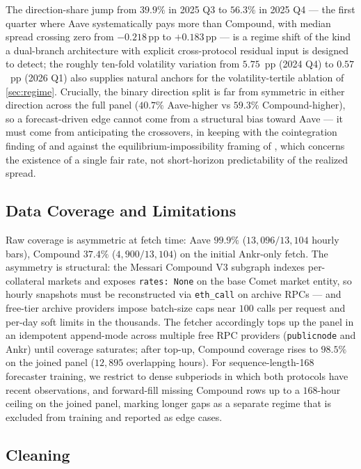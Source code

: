 The direction-share jump from $39.9\%$ in 2025 Q3 to $56.3\%$ in
2025 Q4 --- the first quarter where Aave systematically pays more
than Compound, with median spread crossing zero from $-0.218$\,pp to
$+0.183$\,pp --- is a regime shift of the kind a dual-branch
architecture with explicit cross-protocol residual input is designed
to detect; the roughly ten-fold volatility variation from $5.75$~pp
(2024 Q4) to $0.57$~pp (2026 Q1) also supplies natural anchors for
the volatility-tertile ablation of \cref{sec:regime}. Crucially, the
binary direction split is far from symmetric in either direction
across the full panel ($40.7\%$ Aave-higher vs $59.3\%$
Compound-higher), so a forecast-driven edge cannot come from a
structural bias toward Aave --- it must come from anticipating the
crossovers, in keeping with the cointegration finding of
\cite{gudgeon2020defi} and against the equilibrium-impossibility
framing of \cite{halpern2024fairrates}, which concerns the existence
of a single fair rate, not short-horizon predictability of the
realized spread.

\subsection{Data Coverage and Limitations}
\label{sec:coverage}

Raw coverage is asymmetric at fetch time: Aave $99.9\%$
($13{,}096 / 13{,}104$ hourly bars), Compound $37.4\%$
($4{,}900 / 13{,}104$) on the initial Ankr-only fetch. The asymmetry
is structural: the Messari Compound V3 subgraph indexes per-collateral
markets and exposes \texttt{rates: None} on the base Comet market
entity, so hourly snapshots must be reconstructed via \texttt{eth\_call}
on archive RPCs --- and free-tier archive providers impose batch-size
caps near $100$ calls per request and per-day soft limits in the
thousands. The fetcher accordingly tops up the panel in an idempotent
append-mode across multiple free RPC providers (\texttt{publicnode}
and Ankr) until coverage saturates; after top-up, Compound coverage
rises to $98.5\%$ on the joined panel ($12{,}895$ overlapping hours). For sequence-length-168 forecaster
training, we restrict to dense subperiods in which both protocols have
recent observations, and forward-fill missing Compound rows up to a
$168$-hour ceiling on the joined panel, marking longer gaps as a
separate regime that is excluded from training and reported as edge
cases.

\subsection{Cleaning}
\label{sec:cleaning}

